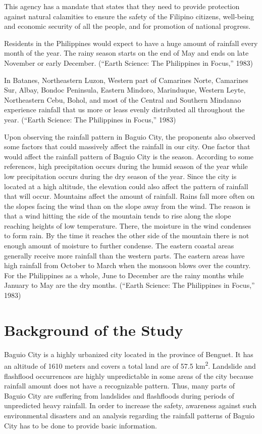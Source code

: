 	This agency has a mandate that states that they need to provide protection against natural calamities to ensure the safety of the Filipino citizens, well-being and economic security of all the people, and for promotion of national progress.
	
	Residents in the Philippines would expect to have a huge amount of rainfall every month of the year.  The rainy season starts on the end of May and ends on late November or early December. (“Earth Science: The Philippines in Focus,” 1983)
	
	In Batanes, Northeastern Luzon, Western part of Camarines Norte, Camarines Sur, Albay, Bondoc Peninsula, Eastern Mindoro, Marinduque, Western Leyte, Northeastern Cebu, Bohol, and most of the Central and Southern Mindanao experience rainfall that us more or leass evenly distributed all throughout the year. (“Earth Science: The Philippines in Focus,” 1983)
	
	Upon observing the rainfall pattern in Baguio City, the proponents also observed some factors that could massively affect the rainfall in our city.  One factor that would affect the rainfall pattern of Baguio City is the season.  According to some references, high precipitation occurs during the humid season of the year while low precipitation occurs during the dry season of the year. Since the city is located at a high altitude, the elevation could also affect the pattern of rainfall that will occur.  Mountains affect the amount of rainfall.  Rains fall more often on the slopes facing the wind than on the slope away from the wind. The reason is that a wind hitting the side of the mountain tends to rise along the slope reaching heights of low temperature.  There, the moisture in the wind condenses to form rain.  By the time it reaches the other side of the mountain there is not enough amount of moisture to further condense.  The eastern coastal areas generally receive more rainfall than the western parts.  The eastern areas have high rainfall from October to March when the monsoon blows over the country.  For the Philippines as a whole, June to December are the rainy months while January to May are the dry months. (“Earth Science: The Philippines in Focus,” 1983)

\section*{Background of the Study}

Baguio City is a highly urbanized city located in the province of Benguet.  It has an altitude of 1610 meters and covers a total land are of 57.5 \si{\square\kilo\meter}. Landslide and flashflood occurrences are highly unpredictable in some areas of the city because rainfall amount does not have a recognizable pattern.  Thus, many parts of Baguio City are suffering from landslides and flashfloods during periods of unpredicted heavy rainfall.  In order to increase the safety, awareness against such environmental disasters and an analysis regarding the rainfall patterns of Baguio City has to be done to provide basic information.

